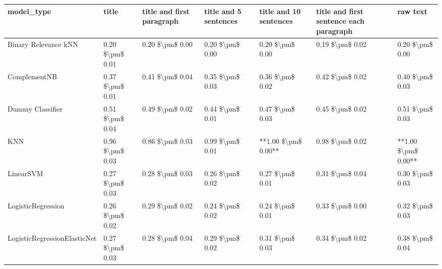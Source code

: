 \begin{tabular}{lllllll}
\toprule
                     model\_type &           title & title and first paragraph & title and 5 sentences & title and 10 sentences & title and first sentence each paragraph &            raw text \\
\midrule
           Binary Relevance kNN & 0.20 \$\textbackslash pm\$ 0.01 &           0.20 \$\textbackslash pm\$ 0.00 &       0.20 \$\textbackslash pm\$ 0.00 &        0.20 \$\textbackslash pm\$ 0.00 &                         0.19 \$\textbackslash pm\$ 0.02 &     0.20 \$\textbackslash pm\$ 0.00 \\
                   ComplementNB & 0.37 \$\textbackslash pm\$ 0.01 &           0.41 \$\textbackslash pm\$ 0.04 &       0.35 \$\textbackslash pm\$ 0.03 &        0.36 \$\textbackslash pm\$ 0.02 &                         0.42 \$\textbackslash pm\$ 0.02 &     0.40 \$\textbackslash pm\$ 0.03 \\
               Dummy Classifier & 0.51 \$\textbackslash pm\$ 0.04 &           0.49 \$\textbackslash pm\$ 0.02 &       0.44 \$\textbackslash pm\$ 0.01 &        0.47 \$\textbackslash pm\$ 0.03 &                         0.45 \$\textbackslash pm\$ 0.02 &     0.51 \$\textbackslash pm\$ 0.03 \\
                            KNN & 0.96 \$\textbackslash pm\$ 0.03 &           0.86 \$\textbackslash pm\$ 0.03 &       0.99 \$\textbackslash pm\$ 0.01 &    **1.00 \$\textbackslash pm\$ 0.00** &                         0.98 \$\textbackslash pm\$ 0.02 & **1.00 \$\textbackslash pm\$ 0.00** \\
                      LinearSVM & 0.27 \$\textbackslash pm\$ 0.03 &           0.28 \$\textbackslash pm\$ 0.03 &       0.26 \$\textbackslash pm\$ 0.02 &        0.27 \$\textbackslash pm\$ 0.01 &                         0.31 \$\textbackslash pm\$ 0.04 &     0.30 \$\textbackslash pm\$ 0.03 \\
             LogisticRegression & 0.26 \$\textbackslash pm\$ 0.02 &           0.29 \$\textbackslash pm\$ 0.02 &       0.24 \$\textbackslash pm\$ 0.02 &        0.24 \$\textbackslash pm\$ 0.01 &                         0.33 \$\textbackslash pm\$ 0.00 &     0.32 \$\textbackslash pm\$ 0.03 \\
   LogisticRegressionElasticNet & 0.27 \$\textbackslash pm\$ 0.03 &           0.28 \$\textbackslash pm\$ 0.04 &       0.29 \$\textbackslash pm\$ 0.02 &        0.31 \$\textbackslash pm\$ 0.03 &                         0.34 \$\textbackslash pm\$ 0.02 &     0.38 \$\textbackslash pm\$ 0.04 \\

\end{tabular}
